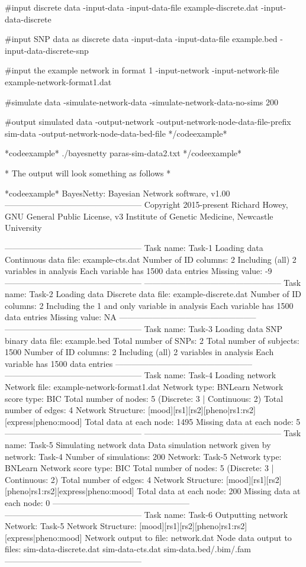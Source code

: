 #input discrete data -input-data -input-data-file example-discrete.dat -input-data-discrete

#input SNP data as discrete data -input-data -input-data-file example.bed -input-data-discrete-snp

#input the example network in format 1 -input-network -input-network-file example-network-format1.dat

#simulate data -simulate-network-data -simulate-network-data-no-sims 200

#output simulated data -output-network -output-network-node-data-file-prefix sim-data -output-network-node-data-bed-file */codeexample*


*codeexample* ./bayesnetty paras-sim-data2.txt */codeexample*

* The output will look something as follows *

*codeexample* BayesNetty: Bayesian Network software, v1.00 -------------------------------------------------- Copyright 2015-present Richard Howey, GNU General Public License, v3 Institute of Genetic Medicine, Newcastle University

-------------------------------------------------- Task name: Task-1 Loading data Continuous data file: example-cts.dat Number of ID columns: 2 Including (all) 2 variables in analysis Each variable has 1500 data entries Missing value: -9 -------------------------------------------------- -------------------------------------------------- Task name: Task-2 Loading data Discrete data file: example-discrete.dat Number of ID columns: 2 Including the 1 and only variable in analysis Each variable has 1500 data entries Missing value: NA -------------------------------------------------- -------------------------------------------------- Task name: Task-3 Loading data SNP binary data file: example.bed Total number of SNPs: 2 Total number of subjects: 1500 Number of ID columns: 2 Including (all) 2 variables in analysis Each variable has 1500 data entries -------------------------------------------------- -------------------------------------------------- Task name: Task-4 Loading network Network file: example-network-format1.dat Network type: BNLearn Network score type: BIC Total number of nodes: 5 (Discrete: 3 | Continuous: 2) Total number of edges: 4 Network Structure: [mood][rs1][rs2][pheno|rs1:rs2][express|pheno:mood] Total data at each node: 1495 Missing data at each node: 5 -------------------------------------------------- -------------------------------------------------- Task name: Task-5 Simulating network data Data simulation network given by network: Task-4 Number of simulations: 200 Network: Task-5 Network type: BNLearn Network score type: BIC Total number of nodes: 5 (Discrete: 3 | Continuous: 2) Total number of edges: 4 Network Structure: [mood][rs1][rs2][pheno|rs1:rs2][express|pheno:mood] Total data at each node: 200 Missing data at each node: 0 -------------------------------------------------- -------------------------------------------------- Task name: Task-6 Outputting network Network: Task-5 Network Structure: [mood][rs1][rs2][pheno|rs1:rs2][express|pheno:mood] Network output to file: network.dat Node data output to files:
 sim-data-discrete.dat
 sim-data-cts.dat
 sim-data.bed/.bim/.fam
--------------------------------------------------

